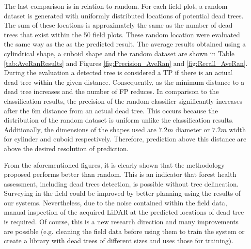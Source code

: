\documentclass{subfiles}
\begin{document}
        \par The last comparison is in relation to random. For each field plot, a random dataset is generated with uniformly distributed locations of potential dead trees. The sum of these locations is approximately the same as the number of dead trees that exist within the 50 field plots. These random location were evaluated the same way as the as the predicted result. The average results obtained using a cylindrical shape, a cuboid shape and the random dataset are shown in Table \ref{tab:AveRanResults} and Figures \ref{fig:Precision_AveRan} and \ref{fig:Recall_AveRan}. During the evaluation a detected tree is considered a TP if there is an actual dead tree within the given distance.  Consequently, as the minimum distance to a dead tree increases and the number of FP reduces. In comparison to the classification results, the precision of the random classifier significantly increases after the 6m distance from an actual dead tree. This occurs because the distribution of the random dataset is uniform unlike the classification results. Additionally, the dimensions of the shapes used are $7.2m$ diameter or $7.2m$ width for cylinder and cuboid respectively. Therefore, prediction above this distance are above the desired resolution of prediction. 
        \par From the aforementioned figures, it is clearly shown that the methodology proposed performs better than random. This is an indicator that forest health assessment, including dead trees detection, is possible without tree delineation. Surveying in the field could be improved by better planning using the results of our systems. Nevertheless, due to the noise contained within the field data, manual inspection of the acquired LiDAR at the predicted locations of dead tree is required. Of course, this is a new research direction and many improvements are possible (e.g. cleaning the field data before using them to train the system or create a library with dead trees of different sizes and uses those for training). 
        
       
\end{document}
